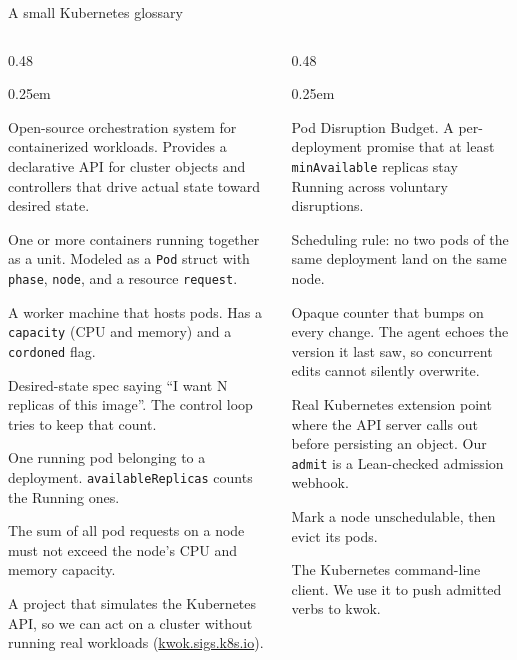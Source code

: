 \documentclass[10pt,aspectratio=169]{beamer}
\begin{document}
\begin{frame}{A small Kubernetes glossary}\label{glossary}
\scriptsize
\begin{columns}[T,onlytextwidth]
\begin{column}{0.48\textwidth}
\begin{description}\itemsep0.25em
  \item[Kubernetes] Open-source orchestration system for containerized workloads. Provides a declarative API for cluster objects and controllers that drive actual state toward desired state.
  \item[Pod] One or more containers running together as a unit. Modeled as a \texttt{Pod} struct with \texttt{phase}, \texttt{node}, and a resource \texttt{request}.
  \item[Node] A worker machine that hosts pods. Has a \texttt{capacity} (CPU and memory) and a \texttt{cordoned} flag.
  \item[Deployment] Desired-state spec saying ``I want N replicas of this image''. The control loop tries to keep that count.
  \item[Replica] One running pod belonging to a deployment. \texttt{availableReplicas} counts the Running ones.
  \item[Capacity] The sum of all pod requests on a node must not exceed the node's CPU and memory capacity.
  \item[kwok] A project that simulates the Kubernetes API, so we can act on a cluster without running real workloads (\href{https://kwok.sigs.k8s.io/}{kwok.sigs.k8s.io}).
\end{description}
\end{column}
\begin{column}{0.48\textwidth}
\begin{description}\itemsep0.25em
  \item[PDB] Pod Disruption Budget. A per-deployment promise that at least \texttt{minAvailable} replicas stay Running across voluntary disruptions.
  \item[Anti-affinity] Scheduling rule: no two pods of the same deployment land on the same node.
  \item[resourceVersion] Opaque counter that bumps on every change. The agent echoes the version it last saw, so concurrent edits cannot silently overwrite.
  \item[Admission webhook] Real Kubernetes extension point where the API server calls out before persisting an object. Our \texttt{admit} is a Lean-checked admission webhook.
  \item[Drain / cordon] Mark a node unschedulable, then evict its pods.
  \item[kubectl] The Kubernetes command-line client. We use it to push admitted verbs to kwok.
\end{description}
\end{column}
\end{columns}
\end{frame}
\end{document}
